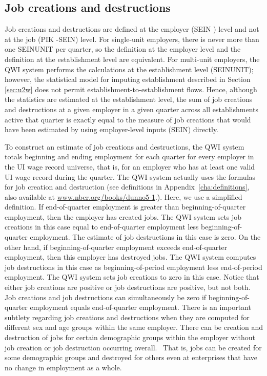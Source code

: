 \subsection{Job creations and destructions}

  Job creations and
destructions are defined at the employer (SEIN%
) level and not at the job (PIK%
-{SEIN}) level. For single-unit employers, there is never more
than one SEINUNIT per quarter, so the definition at the employer level and
the definition at the establishment level are equivalent. For multi-unit
employers, the QWI system performs the calculations at the establishment
level (SEINUNIT); however, the statistical model for imputing establishment
described in Section \ref{sec:u2w} does not permit
establishment-to-establishment flows. Hence, although the statistics are
estimated at the establishment level, the sum of job creations and
destructions at a given employer in a given quarter across all
establishments active that quarter is exactly equal to the measure of job
creations that would have been estimated by using employer-level inputs
(SEIN) directly.

To construct an estimate of job creations and destructions, the QWI system
totals beginning and ending employment for each quarter for every employer
in the UI%
 wage record universe, that is, for an employer who has at least
one valid {UI} wage record during the quarter. The QWI system actually uses
the \cite{DavisHaltiwangerSchuh} formulas for job creation and destruction
(see definitions in Appendix~\ref{cha:definitions}, also available at \href{http://www.nber.org/books/dunno5-1}%
{www.nber.org/books/dunno5-1}.). Here, we use a simplified definition. If
end-of-quarter employment is greater than beginning-of-quarter employment,
then the employer has created jobs. The QWI system sets job creations in
this case equal to end-of-quarter employment less beginning-of-quarter
employment. The estimate of job destructions in this case is zero. On the
other hand, if beginning-of-quarter employment exceeds end-of-quarter
employment, then this employer has destroyed jobs. The QWI system computes
job destructions in this case as beginning-of-period employment less
end-of-period employment. The QWI system sets job creations to zero in this
case. Notice that either job creations are positive or job destructions are
positive, but not both. Job creations and job destructions can
simultaneously be zero if beginning-of-quarter employment equals
end-of-quarter employment. There is an important subtlety regarding job
creations and destructions when they are computed for different sex and age
groups within the same employer. There can be creation and destruction of
jobs for certain demographic groups within the employer without job creation
or job destruction occurring overall. \ That is, jobs can be created for
some demographic groups and destroyed for others even at enterprises that
have no change in employment as a whole.

